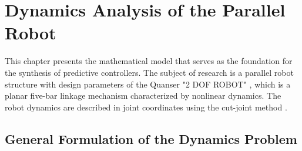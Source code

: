 \chapter{Dynamics Analysis of the Parallel Robot}
\label{ch:model_dynamiczny}

This chapter presents the mathematical model that serves as the foundation for the synthesis of predictive controllers. The subject of research is a parallel robot structure with design parameters of the Quanser "2 DOF ROBOT" \cite{quanser, kkr}, which is a planar five-bar linkage mechanism characterized by nonlinear dynamics. The robot dynamics are described in joint coordinates using the cut-joint method \cite{nikravesh}.

\section{General Formulation of the Dynamics Problem}
\label{sec:teoria_ogolna}

